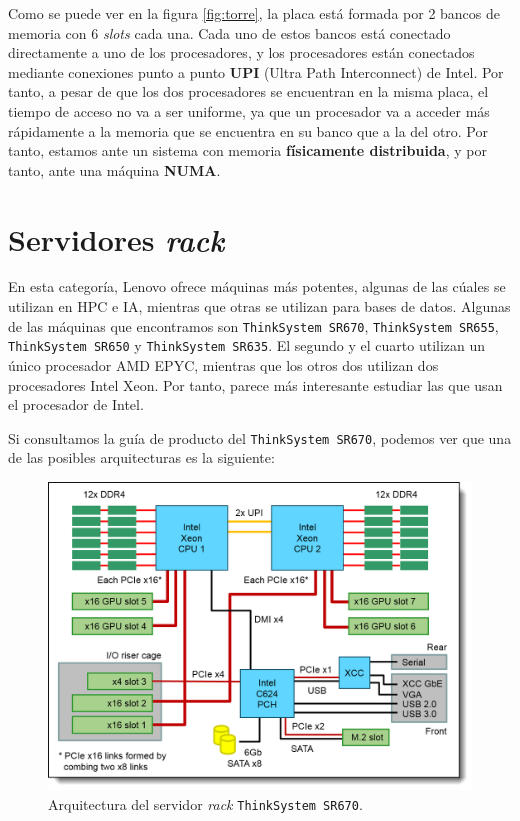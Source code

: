 \documentclass[11pt,a4paper]{article}
\begin{document}
Como se puede ver en la figura \ref{fig:torre}, la placa está formada por 2 bancos de memoria
con 6 \textit{slots} cada una. Cada uno de estos bancos está conectado directamente a uno de los
procesadores, y los procesadores están conectados mediante conexiones punto a punto \textbf{UPI}
(Ultra Path Interconnect) de Intel. Por tanto, a pesar de que los dos procesadores se encuentran
en la misma placa, el tiempo de acceso no va a ser uniforme, ya que un procesador va a acceder más
rápidamente a la memoria que se encuentra en su banco que a la del otro. Por tanto, estamos ante
un sistema con memoria \textbf{físicamente distribuida}, y por tanto, ante una máquina
\textbf{NUMA}.

\section{Servidores \textit{rack}}

En esta categoría, Lenovo ofrece máquinas más potentes, algunas de las cúales se utilizan
en HPC e IA, mientras que otras se utilizan para bases de datos. Algunas de las máquinas que
encontramos son \texttt{ThinkSystem SR670}, \texttt{ThinkSystem SR655},
\texttt{ThinkSystem SR650} y \texttt{ThinkSystem SR635}. El segundo y el cuarto utilizan
un único procesador AMD EPYC, mientras que los otros dos utilizan dos procesadores Intel Xeon.
Por tanto, parece más interesante estudiar las que usan el procesador de Intel.

Si consultamos la guía de producto del \texttt{ThinkSystem SR670}, podemos ver que una de
las posibles arquitecturas es la siguiente:

\begin{figure}[H]
	\centering
	\includegraphics[scale=0.3]{img/rack-diagrama}
	\caption{Arquitectura del servidor \textit{rack} \texttt{ThinkSystem SR670}.}
	\label{fig:rack}
\end{figure}
\end{document}
